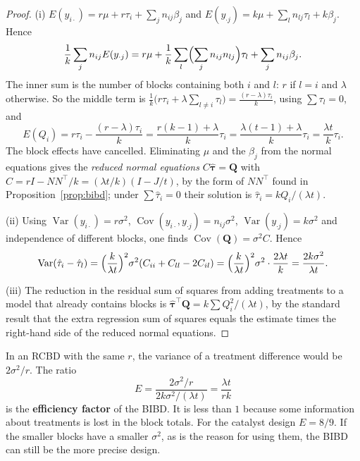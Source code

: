 \documentclass[11pt,a4paper]{article}
\numberwithin{equation}{section}
\DeclareMathOperator{\Var}{Var}
\DeclareMathOperator{\Cov}{Cov}
\theoremstyle{definition}
\begin{document}
\begin{proof}
(i) $E(y_{i\cdot}) = r\mu + r\tau_i + \sum_jn_{ij}\beta_j$ and $E(y_{\cdot j}) = k\mu + \sum_ln_{lj}\tau_l + k\beta_j$. Hence
\[
\frac1k\sum_jn_{ij}E(y_{\cdot j}) = r\mu + \frac1k\sum_l\Bigl(\sum_jn_{ij}n_{lj}\Bigr)\tau_l + \sum_jn_{ij}\beta_j .
\]
The inner sum is the number of blocks containing both $i$ and $l$: $r$ if $l = i$ and $\lambda$ otherwise. So the middle term is $\frac1k\bigl(r\tau_i + \lambda\sum_{l\ne i}\tau_l\bigr) = \frac{(r - \lambda)\tau_i}{k}$,
using $\sum\tau_l = 0$, and
\[
E(Q_i) = r\tau_i - \frac{(r - \lambda)\tau_i}{k} = \frac{r(k - 1) + \lambda}{k}\tau_i = \frac{\lambda(t - 1) + \lambda}{k}\tau_i = \frac{\lambda t}{k}\tau_i .
\]
The block effects have cancelled. Eliminating $\mu$ and the $\beta_j$ from the normal equations gives the \emph{reduced normal equations}
$C\hat{\boldsymbol\tau} = \mathbf Q$ with $C = rI - NN^\top/k = (\lambda t/k)(I - J/t)$, by the form of $NN^\top$ found in Proposition~\ref{prop:bibd}; under $\sum\hat\tau_i = 0$ their
solution is $\hat\tau_i = kQ_i/(\lambda t)$.

(ii) Using $\Var(y_{i\cdot}) = r\sigma^2$, $\Cov(y_{i\cdot}, y_{\cdot j}) = n_{ij}\sigma^2$, $\Var(y_{\cdot j}) = k\sigma^2$ and independence of different blocks, one finds $\Cov(\mathbf Q) = \sigma^2C$. Hence
\[
\Var(\hat\tau_i - \hat\tau_l) = \Bigl(\frac{k}{\lambda t}\Bigr)^2\sigma^2(C_{ii} + C_{ll} - 2C_{il}) = \Bigl(\frac{k}{\lambda t}\Bigr)^2\sigma^2\cdot\frac{2\lambda t}{k} = \frac{2k\sigma^2}{\lambda t} .
\]

(iii) The reduction in the residual sum of squares from adding treatments to a model that already contains blocks is $\hat{\boldsymbol\tau}^\top\mathbf Q = k\sum Q_i^2/(\lambda t)$, by the
standard result that the extra regression sum of squares equals the estimate times the right-hand side of the reduced normal equations.
\end{proof}

In an RCBD with the same $r$, the variance of a treatment difference would be $2\sigma^2/r$. The ratio
\[
E = \frac{2\sigma^2/r}{2k\sigma^2/(\lambda t)} = \frac{\lambda t}{rk}
\]
is the \textbf{efficiency factor} of the BIBD. It is less than $1$ because some information about treatments is lost in the block totals. For the
catalyst design $E = 8/9$. If the smaller blocks have a smaller $\sigma^2$, as is the reason for using them, the BIBD can still be the more precise design.
\end{document}

